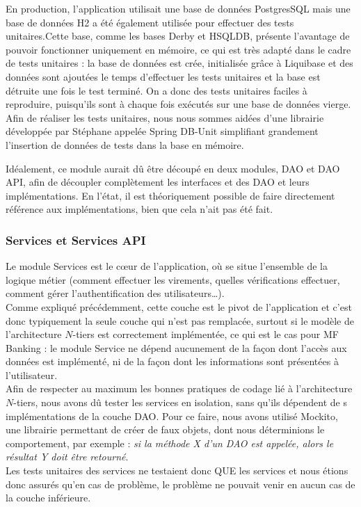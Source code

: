 En production, l'application utilisait une base de données PostgresSQL mais une base de données H2 a été également utilisée pour effectuer des tests unitaires.Cette base, comme les bases Derby et HSQLDB, présente l'avantage de pouvoir fonctionner uniquement en mémoire, ce qui est très adapté dans le cadre de tests unitaires : la base de données est crée, initialisée grâce à Liquibase et des données sont ajoutées le temps d'effectuer les tests unitaires et la base est détruite une fois le test terminé. On a donc des tests unitaires faciles à reproduire, puisqu'ils sont à chaque fois exécutés sur une base de données vierge.\\

Afin de réaliser les tests unitaires, nous nous sommes aidées d'une librairie développée par Stéphane appelée Spring DB-Unit simplifiant grandement l'insertion de données de tests dans la base en mémoire. 

Idéalement, ce module aurait dû être découpé en deux modules, DAO et DAO API, afin de découpler complètement les interfaces et des DAO et leurs implémentations. En l'état, il est théoriquement possible de faire directement référence aux implémentations, bien que cela n'ait pas été fait.\\
 
\subsubsection*{Services et Services API}

Le module Services est le cœur de l'application, où se situe l'ensemble de la logique métier (comment effectuer les virements, quelles vérifications effectuer, comment gérer l'authentification des utilisateurs\ldots).\\
Comme expliqué précédemment, cette couche est le pivot de l'application et c'est donc typiquement la seule couche qui n'est pas remplacée, surtout si le modèle de l'architecture $N$-tiers est correctement implémentée, ce qui est le cas pour MF Banking : le module Service ne dépend aucunement de la façon dont l'accès aux données est implémenté, ni de la façon dont les informations sont présentées à l'utilisateur.\\

Afin de respecter au maximum les bonnes pratiques de codage lié à l'architecture $N$-tiers, nous avons dû tester les services en isolation, sans qu'ils dépendent de s implémentations de la couche DAO. Pour ce faire, nous avons utilisé Mockito, une librairie permettant de créer de \og faux \fg{} objets, dont nous déterminions le comportement, par exemple : \textit{si la méthode X d'un DAO est appelée, alors le résultat Y doit être retourné}.\\
Les tests unitaires des services ne testaient donc QUE les services et nous étions donc assurés qu'en cas de problème, le problème ne pouvait venir en aucun cas de la couche inférieure. 

